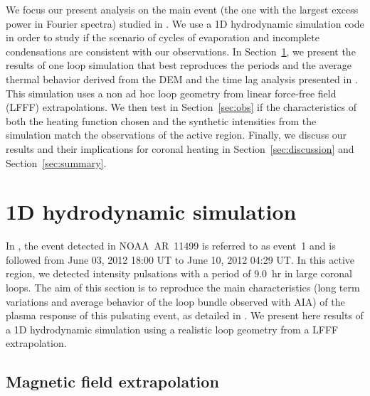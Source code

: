 \documentclass[preprint2]{aastex6}
\begin{document}
\medskip

We focus our present analysis on the main event (the one with the largest excess power in Fourier spectra) studied in \citet{froment2015}. We use a 1D hydrodynamic simulation code in order to study if the scenario of cycles of evaporation and incomplete condensations are consistent with our observations. In Section~\ref{sec:simu}, we present the results of one loop simulation that best reproduces the periods and  the average thermal behavior derived from the DEM and the time lag analysis presented in \citet{froment2015}. This simulation uses a non ad hoc loop geometry from linear force-free field (LFFF) extrapolations. We then test in Section~\ref{sec:obs} if the characteristics of both the heating function chosen and the synthetic intensities from the simulation match the observations of the active region.
Finally, we discuss our results and their implications for coronal heating in Section~\ref{sec:discussion} and Section~\ref{sec:summary}.

\section{1D hydrodynamic simulation}\label{sec:simu}

In \citet{froment2015}, the event detected in NOAA~AR~11499 is referred to as event~1 and is followed from June 03, 2012 18:00 UT to June 10, 2012 04:29 UT. In this active region, we detected intensity pulsations with a period of 9.0~hr in large coronal loops. The aim of this section is to reproduce the main characteristics (long term variations and average behavior of the loop bundle observed with AIA) of the plasma response of this pulsating event, as detailed in \citet{froment2015}. We present here results of a 1D hydrodynamic simulation using a realistic loop geometry from a LFFF extrapolation.

	\subsection{Magnetic field extrapolation}\label{sec:mag_extrapol}
	
	
\end{document}
